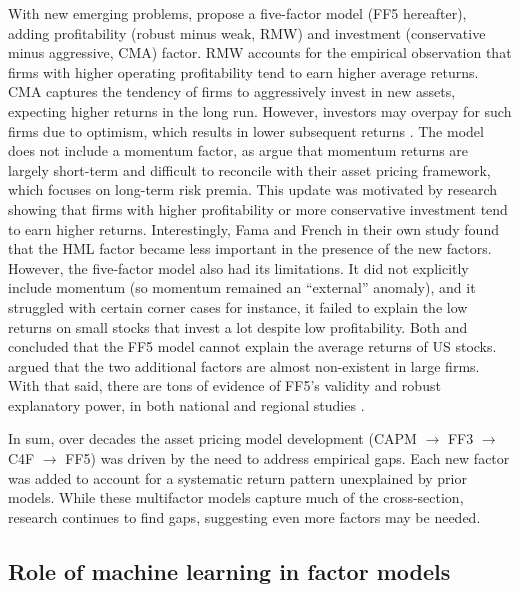 With new emerging problems,  propose a five-factor model (FF5 hereafter), adding profitability (robust minus weak, RMW) and investment (conservative minus aggressive, CMA) factor. RMW accounts for the empirical observation that firms with higher operating profitability tend to earn higher average returns. CMA captures the tendency of firms to aggressively invest in new assets, expecting higher returns in the long run. However, investors may overpay for such firms due to optimism, which results in lower subsequent returns \cite{titman_2004}. The model does not include a momentum factor, as  argue that momentum returns are largely short-term and difficult to reconcile with their asset pricing framework, which focuses on long-term risk premia. This update was motivated by research showing that firms with higher profitability or more conservative investment tend to earn higher returns. Interestingly, Fama and French in their own study found that the HML factor became less important in the presence of the new factors.  However, the five-factor model also had its limitations. It did not explicitly include momentum (so momentum remained an “external” anomaly), and it struggled with certain corner cases for instance, it failed to explain the low returns on small stocks that invest a lot despite low profitability. Both  and  concluded that the FF5 model cannot explain
the average returns of US stocks.  argued that the two additional factors are almost non-existent in large firms. With that said, there are tons of evidence of FF5's validity and robust explanatory power, in both national and regional studies \cite{sohor_litreview_2024}.

In sum, over decades the asset pricing model development (CAPM $\rightarrow$ FF3 $\rightarrow$ C4F $\rightarrow$ FF5) was driven by the need to address empirical gaps. Each new factor was added to account for a systematic return pattern unexplained by prior models. While these multifactor models capture much of the cross-section, research continues to find gaps, suggesting even more factors may be needed.


\subsection{Role of machine learning in factor models}

